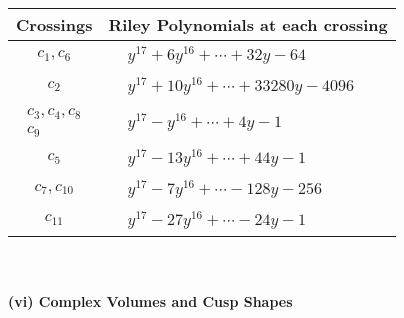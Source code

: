 \documentclass[1p]{elsarticle_modified}
\theoremstyle{definition}
\begin{document}
\begin{tabular}{m{50pt}|m{274pt}}
Crossings & \hspace{64pt}Riley Polynomials at each crossing \\
\hline $$\begin{aligned}c_{1},c_{6}\end{aligned}$$&$\begin{aligned}
&y^{17}+6 y^{16}+\cdots+32 y-64
\end{aligned}$\\
\hline $$\begin{aligned}c_{2}\end{aligned}$$&$\begin{aligned}
&y^{17}+10 y^{16}+\cdots+33280 y-4096
\end{aligned}$\\
\hline $$\begin{aligned}c_{3},c_{4},c_{8}\\c_{9}\end{aligned}$$&$\begin{aligned}
&y^{17}- y^{16}+\cdots+4 y-1
\end{aligned}$\\
\hline $$\begin{aligned}c_{5}\end{aligned}$$&$\begin{aligned}
&y^{17}-13 y^{16}+\cdots+44 y-1
\end{aligned}$\\
\hline $$\begin{aligned}c_{7},c_{10}\end{aligned}$$&$\begin{aligned}
&y^{17}-7 y^{16}+\cdots-128 y-256
\end{aligned}$\\
\hline $$\begin{aligned}c_{11}\end{aligned}$$&$\begin{aligned}
&y^{17}-27 y^{16}+\cdots-24 y-1
\end{aligned}$\\
\hline
\end{tabular}\\~\\
\newpage\flushleft \textbf{(vi) Complex Volumes and Cusp Shapes}
\end{document}
